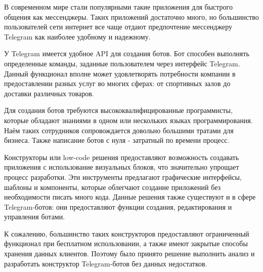 
В современном мире стали популярными такие приложения для
быстрого общения как мессенджеры. Таких приложений достаточно много, но
большинство пользователей сети интернет все чаще отдают предпочтение
мессенджеру Telegram как наиболее удобному и надежному.

У Telegram имеется удобное API для создания ботов. Бот способен
выполнять определенные команды, заданные пользователем через интерфейс
Telegram. Данный функционал вполне может удовлетворять потребности
компании в предоставлении разных услуг во многих сферах: от спортивных залов
до доставки различных товаров.

Для создания ботов требуются высококвалифицированные программисты, которые
обладают знаниями в одном или нескольких языках программирования.
Наём таких сотрудников сопровождается довольно большими тратами для бизнеса.
Также написание ботов с нуля - затратный по времени процесс.

Конструкторы или low-code решения предоставляют возможность создавать
приложения с использование визуальных блоков, что значительно упрощает процесс
разработки. Эти инструменты предлагают графические интерфейсы, шаблоны и
компоненты, которые облегчают создание приложений без необходимости писать
много кода.
Данные решения также существуют и в сфере Telegram-ботов: они
предоставляют функции создания, редактирования и управления ботами.

К сожалению, большинство таких конструкторов предоставляют ограниченный функционал
при бесплатном использовании, а также имеют закрытые
способы хранения данных клиентов. Поэтому было принято решение выполнить анализ и
разработать конструктор Telegram-ботов без данных недостатков.


\pagebreak


